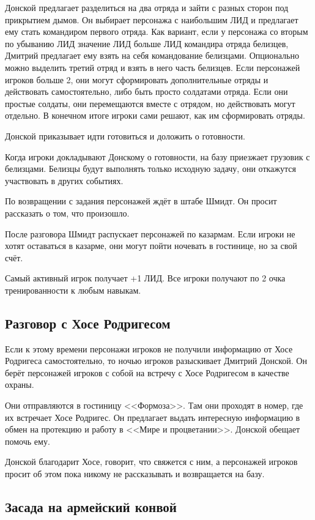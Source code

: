 \documentclass{article}
\begin{document}
Донской предлагает разделиться на два отряда и зайти с разных сторон под
прикрытием дымов. Он выбирает персонажа с наибольшим ЛИД и предлагает
ему стать командиром первого отряда. Как вариант, если у персонажа со
вторым по убыванию ЛИД значение ЛИД больше ЛИД командира отряда
белизцев, Дмитрий предлагает ему взять на себя командование белизцами.
Опционально можно выделить третий отряд и взять в него часть белизцев.
Если персонажей игроков больше 2, они могут сформировать дополнительные
отряды и действовать самостоятельно, либо быть просто солдатами отряда.
Если они простые солдаты, они перемещаются вместе с отрядом, но
действовать могут отдельно. В конечном итоге игроки сами решают, как им
сформировать отряды.

Донской приказывает идти готовиться и доложить о готовности.

Когда игроки докладывают Донскому о готовности, на базу приезжает
грузовик с белизцами. Белизцы будут выполнять только исходную задачу,
они откажутся участвовать в других событиях.

По возвращении с задания персонажей ждёт в штабе Шмидт. Он просит
рассказать о том, что произошло.

После разговора Шмидт распускает персонажей по казармам. Если игроки не
хотят оставаться в казарме, они могут пойти ночевать в гостинице, но за
свой счёт.

Самый активный игрок получает +1 ЛИД. Все игроки получают по 2 очка
тренированности к любым навыкам.

\subsection{Разговор с Хосе
Родригесом}\label{rodriguez-meeting}

Если к этому времени персонажи игроков не получили информацию от Хосе
Родригеса самостоятельно, то ночью игроков разыскивает Дмитрий Донской.
Он берёт персонажей игроков с собой на встречу с Хосе Родригесом в
качестве охраны.

Они отправляются в гостиницу <<Формоза>>. Там они проходят в номер, где их
встречает Хосе Родригес. Он предлагает выдать интересную информацию в
обмен на протекцию и работу в <<Мире и процветании>>. Донской обещает
помочь ему.

Донской благодарит Хосе, говорит, что свяжется с ним, а персонажей
игроков просит об этом пока никому не рассказывать и возвращается на
базу.

\subsection{Засада на армейский
конвой}\label{army-convoy-ambush}
\end{document}

